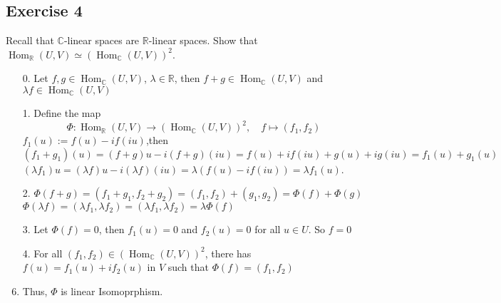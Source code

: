 \documentclass[11pt]{ctexart}
\theoremstyle{definition}
\numberwithin{equation}{section}
\newcommand{\op}[1]{\operatorname{#1}}%
\newcommand{\RR}{\mathbb{R}}
\newcommand{\CC}{\mathbb{C}}
\theoremstyle{definition}
\theoremstyle{remark}
\begin{document}
\subsection{Exercise 4}
Recall that $\CC$-linear spaces are $\RR$-linear spaces. Show that 
$\op{Hom}_{\RR}(U,V)\simeq (\op{Hom}_{\CC}(U,V))^2$.
\begin{aaa}
    \begin{enumerate}
        \item [0.] Let $f,g\in \op{Hom}_{\CC}(U,V)$, $\lambda \in \RR$,  then $f+g\in \op{Hom}_{\CC}(U,V)$ and $\lambda f\in \op{Hom}_{\CC}(U,V)$
        \item [1.] Define the map \[\Phi: \op{Hom}_{\RR}(U,V) \to (\op{Hom}_{\CC}(U,V))^2,\quad f\mapsto (f_1,f_2)\]
               $ f_1(u):=f(u)-if(iu)$,then \\$(f_1+g_1)(u)=(f+g)u-i(f+g)(iu)=f(u)+if(iu)+g(u)+ig(iu)=f_1(u)+g_1(u)$\\$(\lambda f_1)u=(\lambda f)u-i(\lambda f)(iu)=\lambda(f(u)-if(iu))=\lambda f_1(u)$.
        \item [2.] $\Phi(f+g)=(f_1+g_1,f_2+g_2)=(f_1,f_2)+(g_1,g_2)=\Phi(f)+\Phi(g)$\\
         $\Phi(\lambda f)=(\lambda f_1,\lambda f_2)=(\lambda f_1,\lambda f_2)=\lambda \Phi(f)$
        \item [3.] Let $\Phi(f)=0$, then $f_1(u)=0$ and $f_2(u)=0$ for all $u\in U$. So $f=0$
        \item [4.] For all $(f_1,f_2)\in (\op{Hom}_{\CC}(U,V))^2$, there has $f(u)=f_1(u)+if_2(u)$ in $V$ such that $\Phi(f)=(f_1,f_2)$
        \item Thus, $\Phi$ is linear Isomoprphism.
    \end{enumerate}
\end{aaa}
\end{document}
